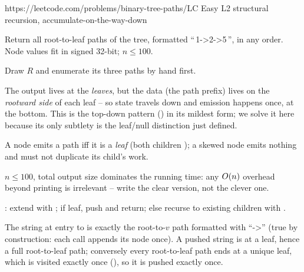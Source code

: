   {https://leetcode.com/problems/binary-tree-paths/}{LC Easy L2}
  {structural recursion, accumulate-on-the-way-down}

\begin{problemstatement}
Return all root-to-leaf paths of the tree, formatted ``\,1->2->5\,'', in any
order. Node values fit in signed 32-bit; $n \le 100$.
\end{problemstatement}

\begin{attemptgate}
Draw $R$ and enumerate its three paths by hand first.
\end{attemptgate}

The output lives at the \emph{leaves}, but the data (the path prefix) lives on the
\emph{rootward side} of each leaf -- so state travels down and emission happens
once, at the bottom. This is the top-down pattern () in its
mildest form; we solve it here because its only subtlety is the leaf/null
distinction just defined.

\begin{observation}
A node emits a path iff it is a \emph{leaf} (both children \nil{}); a skewed node
emits nothing and must not duplicate its child's work.
\end{observation}
\begin{observation}
$n \le 100$, total output size dominates the running time: any $O(n)$
overhead beyond printing is irrelevant -- write the clear version, not the clever
one.
\end{observation}

: extend  with ; if leaf, push and return;
else recurse to existing children with .

\begin{proofbox}
The string at entry to  is exactly the root-to-$v$ path formatted
with ``->'' (true by construction: each call appends its node once). A pushed
string is at a leaf, hence a full root-to-leaf path; conversely every
root-to-leaf path ends at a unique leaf, which is visited exactly once
(), so it is pushed exactly once.
\end{proofbox}

